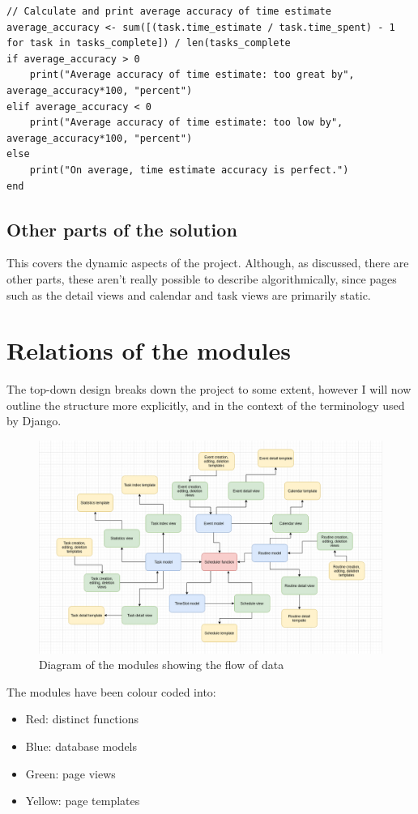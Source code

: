 \documentclass{article}
\begin{document}
\begin{lstlisting}[breaklines]
// Calculate and print average accuracy of time estimate
average_accuracy <- sum([(task.time_estimate / task.time_spent) - 1 for task in tasks_complete]) / len(tasks_complete
if average_accuracy > 0
    print("Average accuracy of time estimate: too great by", average_accuracy*100, "percent")
elif average_accuracy < 0
    print("Average accuracy of time estimate: too low by", average_accuracy*100, "percent")
else
    print("On average, time estimate accuracy is perfect.")
end
\end{lstlisting}

\subsection{Other parts of the solution}
This covers the dynamic aspects of the project.
Although, as discussed, there are other parts,
these aren't really possible to describe algorithmically,
since pages such as the detail views and calendar and task views are primarily static.

\section{Relations of the modules}
The top-down design breaks down the project to some extent,
however I will now outline the structure more explicitly,
and in the context of the terminology used by Django.

\begin{figure}[H]
	\centering
	\includegraphics[width=\linewidth]{Screenshots/mytime_modular_design.png}
	\caption{Diagram of the modules showing the flow of data}
	\label{fig:modular_design}
\end{figure}

The modules have been colour coded into:
\begin{itemize}
  \item Red: distinct functions
  \item Blue: database models
  \item Green: page views
  \item Yellow: page templates
\end{itemize}
\end{document}
